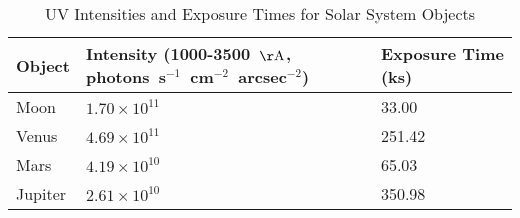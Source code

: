 \begin{table*}
\caption{UV Intensities and Exposure Times for Solar System Objects\label{tab:ss_fluxes}}
\begin{center}
\begin{tabular}{lll}
\hline
\hline
Object & Intensity (1000-3500~${\rm \AA}$, photons~s$^{-1}$~cm$^{-2}$~arcsec$^{-2}$) & Exposure Time (ks) \\
\hline
Moon & $1.70 \times 10^{11}$ & 33.00 \\
Venus & $4.69 \times 10^{11}$ & 251.42 \\
Mars & $4.19 \times 10^{10}$ & 65.03 \\
Jupiter & $2.61 \times 10^{10}$ & 350.98 \\
\hline
\end{tabular}
\end{center}
\end{table*}
